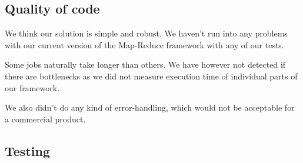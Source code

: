 \documentclass[a4paper,10pt]{article}
\begin{document}
\subsection{Quality of code}
We think our solution is simple and robust. We haven't run into any problems with our current version of the Map-Reduce framework with any of our tests. 

Some jobs naturally take longer than others. We have however not detected if there are bottlenecks as we did not measure execution time of individual parts of our framework.

We also didn't do any kind of error-handling, which would not be acceptable for a commercial product.

\subsection{Testing}
\end{document}
